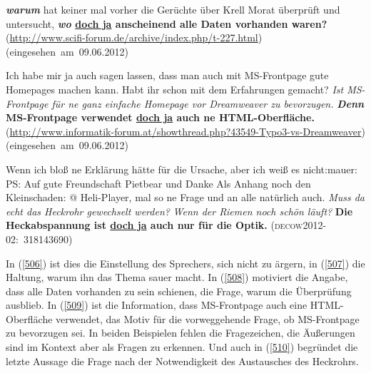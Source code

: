 \begin{exe}
	\ex\label{508} 

	\textbf{\emph{warum}} hat keiner mal vorher die Gerüchte über Krell Morat überprüft und untersucht, \textbf{\textit{wo} \underline{doch ja} 				anscheinend alle Daten vorhanden waren? }
	\newline
	{\scriptsize(\url{http://www.scifi-forum.de/archive/index.php/t-227.html})}
	\newline
	\hbox{}\hfill\hbox{(eingesehen am 09.06.2012)}	
	\newline
	\hbox{}\hfill\hbox{\citet[203]{Mueller2014a}}	
\end{exe}	                 

\begin{exe}
	\ex\label{509} 

	Ich habe mir ja auch sagen lassen, dass man auch mit MS-Frontpage gute Homepages machen kann. Habt ihr schon mit dem Erfahrungen gemacht? 					\emph{Ist MS-Frontpage für ne ganz einfache Homepage vor Dreamweaver zu bevorzugen.} \textbf{\textit{Denn} MS-Frontpage verwendet 					\underline{doch ja} auch ne HTML-Oberfläche.}
	\newline
	{\scriptsize(\url{http://www.informatik-forum.at/showthread.php?43549-Typo3-vs-Dreamweaver})}
	\newline
	\hbox{}\hfill\hbox{(eingesehen am 09.06.2012)}	
\end{exe}	                 

\begin{exe}
	\ex\label{510} 

	Wenn ich bloß ne Erklärung hätte für die Ursache, aber ich weiß es nicht:\linebreak mauer: PS: Auf gute Freundschaft Pietbear und Danke Als Anhang noch den Kleinschaden: @ Heli-Player, mal so ne Frage und an alle natürlich auch. \emph{Muss da echt das Heckrohr gewechselt werden?} \emph{Wenn der Riemen noch schön läuft?} \textbf{Die Heckabspannung ist \underline{doch ja} auch nur für die Optik.}\newline
	\hbox{}\hfill\hbox{\scshape(decow2012-02: 318143690)}
	\newline
	\hbox{}\hfill\hbox{\citet[230]{Mueller2017b}}	
\end{exe}	                 
In (\ref{506}) ist dies die Einstellung des Sprechers, sich nicht zu ärgern, in (\ref{507}) die Haltung, warum ihn das Thema sauer macht. In (\ref{508}) motiviert die Angabe, dass alle Daten vorhanden zu sein schienen, die Frage, warum die Überprüfung ausblieb. In (\ref{509}) ist die Information, dass MS-Frontpage auch eine HTML-Ober\-flä\-che verwendet, das Motiv für die vorweggehende Frage, ob MS-Frontpage zu bevorzugen sei. In beiden Beispielen fehlen die Fragezeichen, die Äußerungen sind im Kontext aber als Fragen zu erkennen. Und auch in (\ref{510}) begründet die letzte Aussage die Frage nach der Notwendigkeit des Austausches des Heckrohrs.

